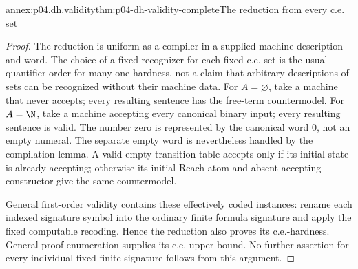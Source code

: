 \begin{annexitem}{annex:p04.dh.validity}{thm:p04-dh-validity-complete}{The reduction from every c.e. set}
\begin{proof}
The reduction is uniform as a compiler in a supplied machine description
and word. The choice of a fixed recognizer for each fixed c.e. set is the
usual quantifier order for many-one hardness, not a claim that arbitrary
descriptions of sets can be recognized without their machine data.
For \(A=\varnothing\), take a machine that never accepts; every resulting
sentence has the free-term countermodel. For \(A=\N\), take a machine
accepting every canonical binary input; every resulting sentence is valid.
The number zero is represented by the canonical word \(0\), not an
empty numeral. The separate empty word is nevertheless handled by the
compilation lemma. A valid empty transition table accepts only if its
initial state is already accepting; otherwise its initial Reach atom
and absent accepting constructor give the same countermodel.

General first-order validity contains these effectively coded instances:
rename each indexed signature symbol into the ordinary finite formula
signature and apply the fixed computable recoding. Hence the reduction
also proves its c.e.-hardness. General proof enumeration supplies its
c.e. upper bound. No further assertion for every individual fixed
finite signature follows from this argument.
\end{proof}
\end{annexitem}

